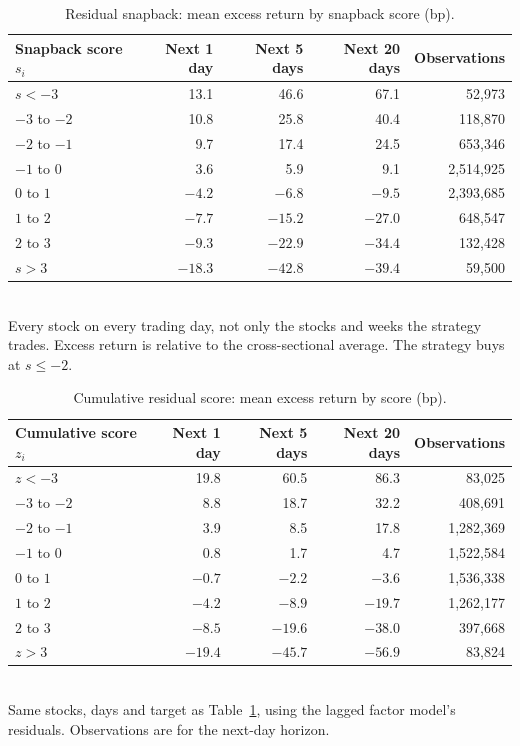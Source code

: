 \documentclass[11pt]{article}
\begin{document}
\begin{table}[H]
\centering
\caption{Residual snapback: mean excess return by snapback score (bp).}
\label{tab:calibration-snap}
\begin{tabular}{lrrrr}
\toprule
Snapback score $s_i$ & Next 1 day & Next 5 days & Next 20 days & Observations \\
\midrule
$s < -3$ & 13.1 & 46.6 & 67.1 & 52,973 \\
$-3$ to $-2$ & 10.8 & 25.8 & 40.4 & 118,870 \\
$-2$ to $-1$ & 9.7 & 17.4 & 24.5 & 653,346 \\
$-1$ to $0$ & 3.6 & 5.9 & 9.1 & 2,514,925 \\
$0$ to $1$ & $-4.2$ & $-6.8$ & $-9.5$ & 2,393,685 \\
$1$ to $2$ & $-7.7$ & $-15.2$ & $-27.0$ & 648,547 \\
$2$ to $3$ & $-9.3$ & $-22.9$ & $-34.4$ & 132,428 \\
$s > 3$ & $-18.3$ & $-42.8$ & $-39.4$ & 59,500 \\
\bottomrule
\end{tabular}
\\[4pt]
\small Every stock on every trading day, not only the stocks and weeks the strategy trades. Excess return is relative to the cross-sectional average. The strategy buys at $s \le -2$.
\end{table}

\begin{table}[H]
\centering
\caption{Cumulative residual score: mean excess return by score (bp).}
\label{tab:calibration-cumulative}
\begin{tabular}{lrrrr}
\toprule
Cumulative score $z_i$ & Next 1 day & Next 5 days & Next 20 days & Observations \\
\midrule
$z < -3$ & 19.8 & 60.5 & 86.3 & 83,025 \\
$-3$ to $-2$ & 8.8 & 18.7 & 32.2 & 408,691 \\
$-2$ to $-1$ & 3.9 & 8.5 & 17.8 & 1,282,369 \\
$-1$ to $0$ & 0.8 & 1.7 & 4.7 & 1,522,584 \\
$0$ to $1$ & $-0.7$ & $-2.2$ & $-3.6$ & 1,536,338 \\
$1$ to $2$ & $-4.2$ & $-8.9$ & $-19.7$ & 1,262,177 \\
$2$ to $3$ & $-8.5$ & $-19.6$ & $-38.0$ & 397,668 \\
$z > 3$ & $-19.4$ & $-45.7$ & $-56.9$ & 83,824 \\
\bottomrule
\end{tabular}
\\[4pt]
\small Same stocks, days and target as Table~\ref{tab:calibration-snap}, using the lagged factor model's residuals. Observations are for the next-day horizon.
\end{table}
\end{document}
